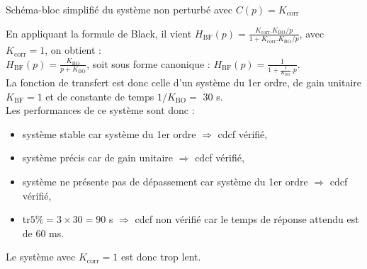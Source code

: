 \begin{marginfigure}
\centering
{}%
\caption{{ Schéma-bloc  simplifié du système non perturbé avec $C(p) = K_{\text{corr}}$}
\label{fig:schema_bloc_simplifie}}
\end{marginfigure}

\fi



\ifprof
\begin{corrige}
En appliquant la formule de Black, il vient $H_{\text{BF}}(p)= \frac{K_{\text{corr}}.K_{\text{BO}}/p}{1+K_{\text{corr}}.K_{\text{BO}}/p}$, avec $K_{\text{corr}} = 1$, on obtient :\\
$H_{\text{BF}}(p)= \frac{K_{\text{BO}}}{p+K_{\text{BO}}}$, soit sous forme canonique : $H_{\text{BF}}(p)= \frac{1}{1+\frac{1}{K_{\text{BO}}}.p}$.\\
La fonction de transfert est donc celle d'un système du 1er ordre, de gain unitaire $K_{\text{BF}}=1$ et de constante de temps $1/K_{\text{BO}} =$ 30 s.\\
Les performances de ce système sont donc :
\begin{itemize}
\item système stable car système du 1er ordre $ \Rightarrow $ cdcf vérifié,
\item système précis car de gain unitaire $ \Rightarrow $ cdcf vérifié,
\item système ne présente pas de dépassement car système du 1er ordre $ \Rightarrow $ cdcf vérifié,
\item tr$5\% = 3 \times 30 = 90$ s $ \Rightarrow $ cdcf non vérifié car le temps de réponse attendu est de 60 ms.
\end{itemize}
Le système avec $K_{\text{corr}} = 1$ est donc trop lent.
\end{corrige}
\fi

